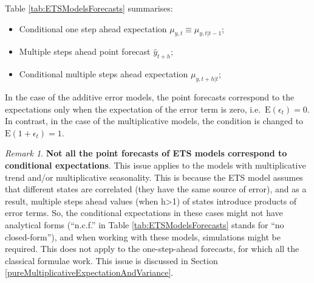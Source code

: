 \documentclass[]{book}
\providecommand{\tightlist}{%
  \setlength{\itemsep}{0pt}\setlength{\parskip}{0pt}}
\theoremstyle{definition}
\theoremstyle{definition}
\theoremstyle{definition}
\theoremstyle{definition}
\theoremstyle{remark}
\newtheorem*{remark}{Remark}
\begin{document}
Table \ref{tab:ETSModelsForecasts} summarises:

\begin{itemize}
\tightlist
\item
  Conditional one step ahead expectation \(\mu_{y,t} \equiv \mu_{y,t|t-1}\);
\item
  Multiple steps ahead point forecast \(\hat{y}_{t+h}\);
\item
  Conditional multiple steps ahead expectation \(\mu_{y,t+h|t}\);
\end{itemize}

In the case of the additive error models, the point forecasts correspond to the expectations only when the expectation of the error term is zero, i.e.~\(\text{E}(\epsilon_t)=0\). In contrast, in the case of the multiplicative models, the condition is changed to \(\text{E}(1+\epsilon_t)=1\).

\begin{remark}
\textbf{Not all the point forecasts of ETS models correspond to conditional expectations}. This issue applies to the models with multiplicative trend and/or multiplicative seasonality. This is because the ETS model assumes that different states are correlated (they have the same source of error), and as a result, multiple steps ahead values (when h\textgreater{}1) of states introduce products of error terms. So, the conditional expectations in these cases might not have analytical forms (``n.c.f.'' in Table \ref{tab:ETSModelsForecasts} stands for ``no closed-form''), and when working with these models, simulations might be required. This does not apply to the one-step-ahead forecasts, for which all the classical formulae work. This issue is discussed in Section \ref{pureMultiplicativeExpectationAndVariance}.
\end{remark}
\end{document}
